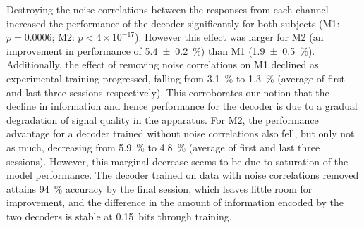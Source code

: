Destroying the noise correlations between the responses from each channel increased the performance of the decoder significantly for both subjects (\ac{M1}: $p=0.0006$; \ac{M2}: $p < 4 \times 10^{-17}$).
However this effect was larger for \ac{M2} (an improvement in performance of \SI{5.4\pm0.2}{\percent}) than \ac{M1} (\SI{+1.9\pm0.5}{\percent}).
Additionally, the effect of removing noise correlations on \ac{M1} declined as experimental training progressed, falling from \SI{3.1}{\percent} to \SI{1.3}{\percent} (average of first and last three sessions respectively).
This corroborates our notion that the decline in information and hence performance for the decoder is due to a gradual degradation of signal quality in the apparatus.
For \ac{M2}, the performance advantage for a decoder trained without noise correlations also fell, but only not as much, decreasing from \SI{5.9}{\percent} to \SI{4.8}{\percent} (average of first and last three sessions).
However, this marginal decrease seems to be due to saturation of the model performance.
The decoder trained on data with noise correlations removed attains \SI{94}{\percent} accuracy by the final session, which leaves little room for improvement, and the difference in the amount of information encoded by the two decoders is stable at \SI{0.15}{bits} through training.

%
%

